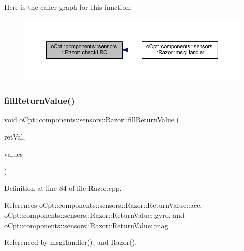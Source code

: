 Here is the caller graph for this function\+:\nopagebreak
\begin{figure}[H]
\begin{center}
\leavevmode
\includegraphics[width=350pt]{classo_cpt_1_1components_1_1sensors_1_1_razor_a0905dcac63406a3885fa8c2d0e952a39_icgraph}
\end{center}
\end{figure}
\hypertarget{classo_cpt_1_1components_1_1sensors_1_1_razor_a1c058bfc9483cfcf94456d498bff380e}{}\label{classo_cpt_1_1components_1_1sensors_1_1_razor_a1c058bfc9483cfcf94456d498bff380e} 
\subsubsection{\texorpdfstring{fill\+Return\+Value()}{fillReturnValue()}}
{\footnotesize\ttfamily void o\+Cpt\+::components\+::sensors\+::\+Razor\+::fill\+Return\+Value (\begin{DoxyParamCaption}\item[{\hyperlink{classo_cpt_1_1components_1_1sensors_1_1_razor_aab55c5b1a96ce97421e4696599549954}{Razor\+::\+Return\+Value\+\_\+t} \&}]{ret\+Val,  }\item[{float $\ast$}]{values }\end{DoxyParamCaption})\hspace{0.3cm}{\ttfamily [private]}}



Definition at line 84 of file Razor.\+cpp.



References o\+Cpt\+::components\+::sensors\+::\+Razor\+::\+Return\+Value\+::acc, o\+Cpt\+::components\+::sensors\+::\+Razor\+::\+Return\+Value\+::gyro, and o\+Cpt\+::components\+::sensors\+::\+Razor\+::\+Return\+Value\+::mag.



Referenced by msg\+Handler(), and Razor().

